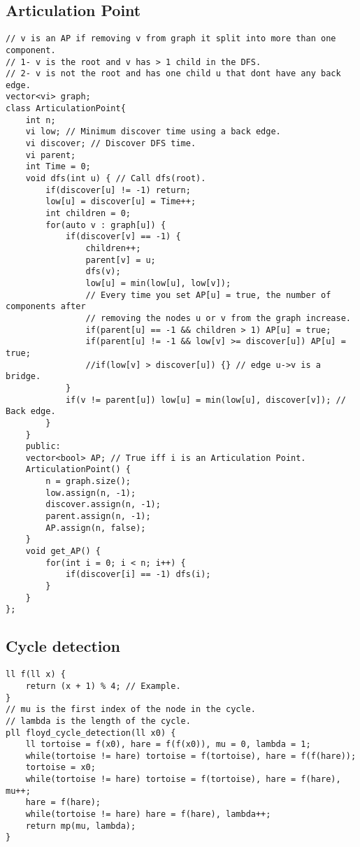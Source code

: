 \documentclass[a4paper]{article}
\begin{document}
\subsection*{Articulation Point}
\begin{verbatim}
// v is an AP if removing v from graph it split into more than one component.
// 1- v is the root and v has > 1 child in the DFS.
// 2- v is not the root and has one child u that dont have any back edge.
vector<vi> graph;
class ArticulationPoint{
    int n;
    vi low; // Minimum discover time using a back edge.
    vi discover; // Discover DFS time.
    vi parent;
    int Time = 0;
    void dfs(int u) { // Call dfs(root).
        if(discover[u] != -1) return;
        low[u] = discover[u] = Time++;
        int children = 0;
        for(auto v : graph[u]) {
            if(discover[v] == -1) {
                children++;
                parent[v] = u;
                dfs(v);
                low[u] = min(low[u], low[v]);
                // Every time you set AP[u] = true, the number of components after
                // removing the nodes u or v from the graph increase.
                if(parent[u] == -1 && children > 1) AP[u] = true;
                if(parent[u] != -1 && low[v] >= discover[u]) AP[u] = true;
                //if(low[v] > discover[u]) {} // edge u->v is a bridge.
            }
            if(v != parent[u]) low[u] = min(low[u], discover[v]); // Back edge.
        }
    }
    public:
    vector<bool> AP; // True iff i is an Articulation Point.
    ArticulationPoint() {
        n = graph.size();
        low.assign(n, -1);
        discover.assign(n, -1);
        parent.assign(n, -1);
        AP.assign(n, false);
    }
    void get_AP() {
        for(int i = 0; i < n; i++) {
            if(discover[i] == -1) dfs(i);
        }
    }
};
\end{verbatim}
\subsection*{Cycle detection}
\begin{verbatim}
ll f(ll x) {
    return (x + 1) % 4; // Example.
}
// mu is the first index of the node in the cycle.
// lambda is the length of the cycle.
pll floyd_cycle_detection(ll x0) {
    ll tortoise = f(x0), hare = f(f(x0)), mu = 0, lambda = 1;
    while(tortoise != hare) tortoise = f(tortoise), hare = f(f(hare));
    tortoise = x0;
    while(tortoise != hare) tortoise = f(tortoise), hare = f(hare), mu++;
    hare = f(hare);
    while(tortoise != hare) hare = f(hare), lambda++;
    return mp(mu, lambda);
}
\end{verbatim}
\end{document}
